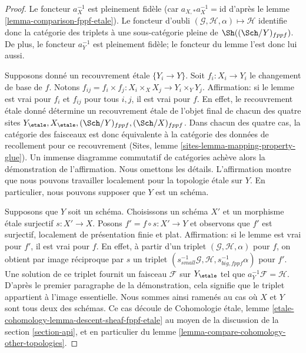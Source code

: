 \begin{proof}
Le foncteur $a_X^{-1}$ est pleinement fidèle (car
$a_{X, *}a_X^{-1} = \text{id}$ d'après le lemme
\ref{lemma-comparison-fppf-etale}). Le foncteur d'oubli
$(\mathcal{G}, \mathcal{H}, \alpha) \mapsto \mathcal{H}$ identifie donc la
catégorie des triplets à une sous-catégorie pleine de $\Sh((\Sch/Y)_{fppf})$.
De plus, le foncteur $a_Y^{-1}$ est pleinement fidèle; le foncteur du lemme
l'est donc lui aussi.

\medskip\noindent
Supposons donné un recouvrement étale $\{Y_i \to Y\}$.
Soit $f_i : X_i \to Y_i$ le changement de base de $f$.
Notons $f_{ij} = f_i \times f_j : X_i \times_X X_j \to Y_i \times_Y Y_j$.
Affirmation: si le lemme est vrai pour $f_i$ et $f_{ij}$ pour tous $i,j$, il
est vrai pour $f$. En effet, le recouvrement étale donné détermine un
recouvrement étale de l'objet final de chacun des quatre sites
$Y_\etale, X_\etale, (\Sch/Y)_{fppf}, (\Sch/X)_{fppf}$.
Dans chacun des quatre cas, la catégorie des faisceaux est donc équivalente à
la catégorie des données de recollement pour ce recouvrement (Sites, lemme
\ref{sites-lemma-mapping-property-glue}). Un immense diagramme commutatif de
catégories achève alors la démonstration de l'affirmation. Nous omettons les
détails. L'affirmation montre que nous pouvons travailler localement pour la
topologie étale sur $Y$. En particulier, nous pouvons supposer que $Y$ est un
schéma.

\medskip\noindent
Supposons que $Y$ soit un schéma. Choisissons un schéma $X'$ et un morphisme
étale surjectif $s : X' \to X$. Posons $f' = f \circ s : X' \to Y$ et
observons que $f'$ est surjectif, localement de présentation finie et plat.
Affirmation: si le lemme est vrai pour $f'$, il est vrai pour $f$.
En effet, à partir d'un triplet $(\mathcal{G}, \mathcal{H}, \alpha)$ pour $f$,
on obtient par image réciproque par $s$ un triplet
$(s_{small}^{-1}\mathcal{G}, \mathcal{H}, s_{big, fppf}^{-1}\alpha)$ pour $f'$.
Une solution de ce triplet fournit un faisceau $\mathcal{F}$ sur $Y_\etale$
tel que $a_Y^{-1}\mathcal{F} = \mathcal{H}$. D'après le premier paragraphe de
la démonstration, cela signifie que le triplet appartient à l'image essentielle.
Nous sommes ainsi ramenés au cas où $X$ et $Y$ sont tous deux des schémas.
Ce cas découle de Cohomologie étale, lemme
\ref{etale-cohomology-lemma-descent-sheaf-fppf-etale}
au moyen de la discussion de la section \ref{section-api}, et en particulier
du lemme \ref{lemma-compare-cohomology-other-topologies}.
\end{proof}




